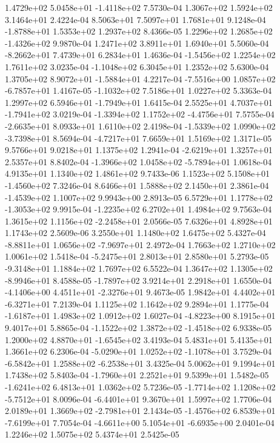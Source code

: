  1.4729e+02  5.0458e+01 -1.4118e+02  7.5730e-04
1.3067e+02 1.5924e+02 3.1464e+01  2.4224e-04
8.5063e+01 7.5097e+01 1.7681e+01  9.1248e-04
-1.8788e+01  1.5353e+02  1.2937e+02  8.4366e-05
 1.2296e+02  1.2685e+02 -1.4326e+02  9.9870e-04
1.2471e+02 3.8911e+01 1.6940e+01  5.5060e-04
-8.2662e+01  7.4739e+01  6.2834e+01  1.4636e-04
-1.5456e+02  1.2254e+02  1.7611e+02  3.0235e-04
-1.1048e+02  6.3045e+01  1.2352e+02  5.6300e-04
 1.3705e+02  8.9072e+01 -1.5884e+01  4.2217e-04
-7.5516e+00  1.0857e+02 -6.7857e+01  1.4167e-05
-1.1032e+02  7.5186e+01  1.0227e+02  5.3363e-04
 1.2997e+02  6.5946e+01 -1.7949e+01  1.6415e-04
 2.5525e+01  4.7037e+01 -1.7941e+02  3.0219e-04
-1.3394e+02  1.1752e+02 -4.4756e+01  7.5755e-04
-2.6635e+01  8.0933e+01  1.6110e+02  2.4198e-04
-1.5339e+02  1.0990e+02 -3.7398e+01  8.5694e-04
-4.7217e+01  7.6659e+01  1.5169e+02  1.3171e-05
9.5766e+01 9.0218e+01 1.1375e+02  1.2941e-04
-2.6219e+01  1.3257e+01  2.5357e+01  8.8402e-04
-1.3966e+02  1.0458e+02 -5.7894e+01  1.0618e-04
4.9135e+01 1.1340e+02 1.4861e+02  9.7433e-06
 1.1523e+02  5.1508e+01 -1.4560e+02  7.3246e-04
8.6466e+01 1.5888e+02 2.1450e+01  2.3861e-04
-1.4539e+02  1.1007e+02  9.9943e+00  2.8913e-05
 6.5729e+01  1.1778e+02 -1.3053e+02  9.9915e-04
-1.2235e+02  6.2702e+01  1.4984e+02  9.7563e-04
 1.3615e+02  1.1156e+02 -2.2458e+01  2.0566e-05
7.6326e+01 4.8928e+01 1.1743e+02  2.5609e-06
3.2550e+01 1.1480e+02 1.6475e+02  5.4327e-04
-8.8811e+01  1.0656e+02 -7.9697e+01  2.4972e-04
1.7663e+02 1.2710e+02 1.0061e+02  1.5418e-04
-5.2475e+01  2.8013e+01  2.8580e+01  5.2793e-05
-9.3148e+01  1.1884e+02  1.7697e+02  6.5522e-04
 1.3647e+02  1.1305e+02 -8.9946e+01  8.4588e-05
-1.7897e+02  3.9214e+01  2.2918e+01  1.6550e-04
-4.1406e+00  4.4511e+01 -2.3276e+01  9.4673e-05
 1.9842e+01  4.4402e+01 -6.3271e+01  7.2139e-04
1.1125e+02 1.1642e+02 9.2894e+01  1.1775e-04
-1.6187e+01  1.4983e+02  1.0912e+02  1.6027e-04
-4.8223e+00  8.1915e+01  9.4017e+01  5.8865e-04
-1.1522e+02  1.3872e+02 -1.4518e+02  6.9338e-05
 1.2000e+02  4.8870e+01 -1.6545e+02  3.4193e-04
5.4831e+01 5.4135e+01 1.3661e+02  6.2306e-04
-5.0290e+01  1.0252e+02 -1.1078e+01  3.7529e-04
-6.5842e+01  1.2588e+02 -6.2538e+01  3.4325e-04
5.0062e+01 9.1994e+01 1.7438e+02  5.8403e-04
-1.7960e+01  2.2521e+01  9.5399e+01  1.5482e-05
-1.6241e+02  6.4813e+01  1.0362e+02  5.7236e-05
-1.7714e+02  1.1208e+02 -5.7512e+01  8.0096e-04
-6.4401e+01  9.3670e+01  1.5997e+02  1.7706e-04
 2.0189e+01  1.3669e+02 -2.7981e+01  2.1434e-05
-1.4576e+02  6.8539e+01 -7.6199e+01  7.7054e-04
-4.6611e+00  5.1054e+01 -6.6935e+00  2.0401e-04
1.2246e+02 1.5075e+02 5.4374e+01  2.5425e-05
